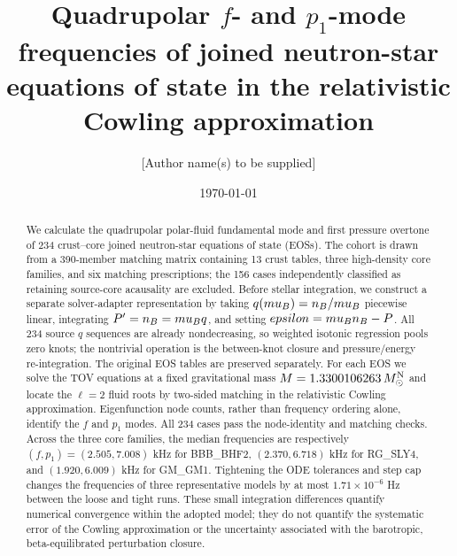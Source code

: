 \documentclass[aps,prd,twocolumn,superscriptaddress,nofootinbib]{revtex4-2}
\newcommand{\MsunN}{M_{\odot}^{\rm N}}
\begin{document}
\title{Quadrupolar $f$- and $p_1$-mode frequencies of joined neutron-star equations of state in the relativistic Cowling approximation}

\author{[Author name(s) to be supplied]}
\date{\today}

\begin{abstract}
We calculate the quadrupolar polar-fluid fundamental mode and first pressure overtone of 234 crust--core joined neutron-star equations of state (EOSs). The cohort is drawn from a 390-member matching matrix containing 13 crust tables, three high-density core families, and six matching prescriptions; the 156 cases independently classified as retaining source-core acausality are excluded. Before stellar integration, we construct a separate solver-adapter representation by taking $q(\\mu_B)=n_B/\\mu_B$ piecewise linear, integrating $P'=n_B=\\mu_Bq$, and setting $\\epsilon=\\mu_Bn_B-P$. All 234 source $q$ sequences are already nondecreasing, so weighted isotonic regression pools zero knots; the nontrivial operation is the between-knot closure and pressure/energy re-integration. The original EOS tables are preserved separately. For each EOS we solve the TOV equations at a fixed gravitational mass $M=1.3300106263\,\MsunN$ and locate the $\ell=2$ fluid roots by two-sided matching in the relativistic Cowling approximation. Eigenfunction node counts, rather than frequency ordering alone, identify the $f$ and $p_1$ modes. All 234 cases pass the node-identity and matching checks. Across the three core families, the median frequencies are respectively $(f,p_1)=(2.505,7.008)$ kHz for BBB\_BHF2, $(2.370,6.718)$ kHz for RG\_SLY4, and $(1.920,6.009)$ kHz for GM\_GM1. Tightening the ODE tolerances and step cap changes the frequencies of three representative models by at most $1.71\times10^{-6}$ Hz between the loose and tight runs. These small integration differences quantify numerical convergence within the adopted model; they do not quantify the systematic error of the Cowling approximation or the uncertainty associated with the barotropic, beta-equilibrated perturbation closure.
\end{abstract}

\maketitle
\end{document}
